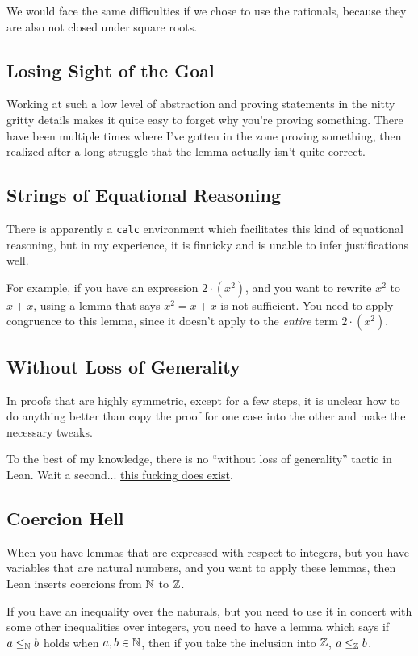 \documentclass{article}
\begin{document}
We would face the same difficulties if we chose to use the rationals, because they are also not closed under square roots.

\subsection{Losing Sight of the Goal}
Working at such a low level of abstraction and proving statements in the nitty gritty details makes it quite easy to forget why you're proving something.
There have been multiple times where I've gotten in the zone proving something, then realized after a long struggle that the lemma actually isn't quite correct.

\subsection{Strings of Equational Reasoning}
There is apparently a \texttt{calc} environment which facilitates this kind of equational reasoning, but in my experience, it is finnicky and is unable to infer justifications well.

For example, if you have an expression $2 \cdot (x^2)$, and you want to rewrite $x^2$ to $x + x$, using a lemma that says $x^2 = x + x$ is not sufficient.
You need to apply congruence to this lemma, since it doesn't apply to the \textit{entire} term $2 \cdot (x^2)$.

\subsection{Without Loss of Generality}
In proofs that are highly symmetric, except for a few steps, it is unclear how to do anything better than copy the proof for one case into the other and make the necessary tweaks.

To the best of my knowledge, there is no ``without loss of generality'' tactic in Lean.
Wait a second... \href{https://leanprover-community.github.io/mathlib_docs/tactic/wlog.html}{this fucking does exist}.

\subsection{Coercion Hell}
When you have lemmas that are expressed with respect to integers, but you have variables that are natural numbers, and you want to apply these lemmas, then Lean inserts coercions from $\mathbb{N}$ to $\mathbb{Z}$.

If you have an inequality over the naturals, but you need to use it in concert with some other inequalities over integers, you need to have a lemma which says if $a \leq_{\mathbb{N}} b$ holds when $a,b \in \mathbb{N}$, then if you take the inclusion into $\mathbb{Z}$, $a \leq_{\mathbb{Z}} b$.
\end{document}
